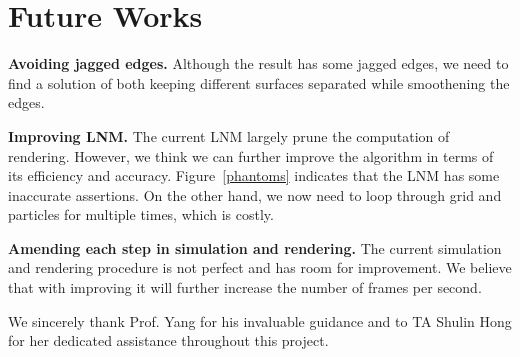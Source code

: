 \documentclass[sigconf]{acmart}
\begin{document}
\section{Future Works}

\textbf{Avoiding jagged edges.} Although the result has some jagged edges, we need to find a solution of both keeping different surfaces separated while smoothening the edges.

\textbf{Improving LNM.} The current LNM largely prune the computation of rendering. However, we think we can further improve the algorithm in terms of its efficiency and accuracy. Figure~\ref{phantoms} indicates that the LNM has some inaccurate assertions. On the other hand, we now need to loop through grid and particles for multiple times, which is costly.

\textbf{Amending each step in simulation and rendering.} The current simulation and rendering procedure is not perfect and has room for improvement. We believe that with improving it will further increase the number of frames per second.


\begin{acks}
We sincerely thank Prof. Yang for his invaluable guidance and to TA Shulin Hong for her dedicated assistance throughout this project.
\end{acks}





\appendix
\end{document}
